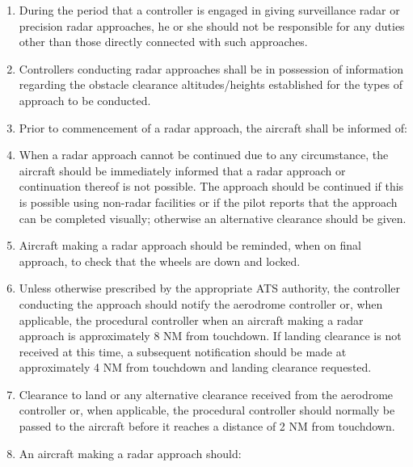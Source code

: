 \begin{enumeratesc}
    \begin{enumerate}
        \item During the period that a controller is engaged in giving surveillance radar or precision radar approaches, he or she should not be responsible for any duties other than those directly connected with such approaches.
        \item Controllers conducting radar approaches shall be in possession of information regarding the obstacle clearance altitudes/heights established for the types of approach to be conducted.
        \item Prior to commencement of a radar approach, the aircraft shall be informed of:
        

        \item When a radar approach cannot be continued due to any circumstance, the aircraft should be immediately informed that a radar approach or continuation thereof is not possible. The approach should be continued if this is possible using non-radar facilities or if the pilot reports that the approach can be completed visually; otherwise an alternative clearance should be given.
        \item Aircraft making a radar approach should be reminded, when on final approach, to check that the wheels are down and locked.
        \item Unless otherwise prescribed by the appropriate ATS authority, the controller conducting the approach should notify the aerodrome controller or, when applicable, the procedural controller when an aircraft making a radar approach is approximately 8 NM from touchdown. If landing clearance is not received at this time, a subsequent notification should be made at approximately 4 NM from touchdown and landing clearance requested.
        \item Clearance to land or any alternative clearance received from the aerodrome controller or, when applicable, the procedural controller should normally be passed to the aircraft before it reaches a distance of 2 NM from touchdown.
        \item \label{8.9.6.1.8} An aircraft making a radar approach should:
        

\end{enumerate}
\end{enumeratesc}
